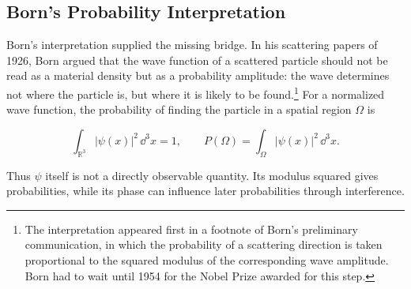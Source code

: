 \subsection{Born's Probability Interpretation}
\label{subsec:born-probability}
Born's interpretation supplied the missing bridge. In his scattering papers of 1926, Born argued that the wave function of a scattered particle should not be read as a material density but as a probability amplitude: the wave determines not where the particle is, but where it is likely to be found.\footnote{The interpretation appeared first in a footnote of Born's preliminary communication, in which the probability of a scattering direction is taken proportional to the squared modulus of the corresponding wave amplitude. Born had to wait until 1954 for the Nobel Prize awarded for this step.} For a normalized wave function, the probability of finding the particle in a spatial region $\Omega$ is
\begin{linenomath}
    \begin{equation}
        \int_{\mathbb{R}^3}|\psi(x)|^2\,\dd^3x=1,
        \qquad
        P(\Omega)=\int_{\Omega}|\psi(x)|^2\,\dd^3x.
    \end{equation}
\end{linenomath}
Thus $\psi$ itself is not a directly observable quantity. Its modulus squared gives probabilities, while its phase can influence later probabilities through interference.

